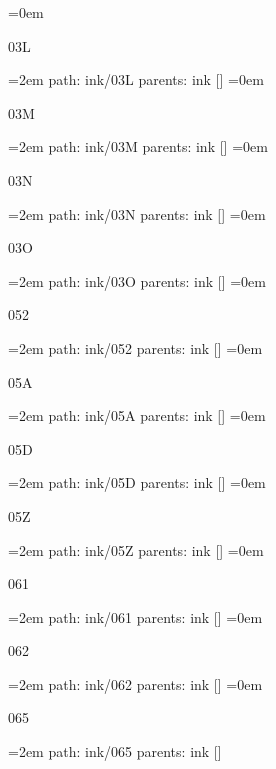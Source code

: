 \smallskip
\leftskip=0em
\par\endgroup
\bigskip
{}
03L
\smallskip
\par\begingroup
\leftskip=2em
path: ink/03L
\smallskip
parents:  ink []
\smallskip
\leftskip=0em
\par\endgroup
\bigskip
{}
03M
\smallskip
\par\begingroup
\leftskip=2em
path: ink/03M
\smallskip
parents:  ink []
\smallskip
\leftskip=0em
\par\endgroup
\bigskip
{}
03N
\smallskip
\par\begingroup
\leftskip=2em
path: ink/03N
\smallskip
parents:  ink []
\smallskip
\leftskip=0em
\par\endgroup
\bigskip
{}
03O
\smallskip
\par\begingroup
\leftskip=2em
path: ink/03O
\smallskip
parents:  ink []
\smallskip
\leftskip=0em
\par\endgroup
\bigskip
{}
052
\smallskip
\par\begingroup
\leftskip=2em
path: ink/052
\smallskip
parents:  ink []
\smallskip
\leftskip=0em
\par\endgroup
\bigskip
{}
05A
\smallskip
\par\begingroup
\leftskip=2em
path: ink/05A
\smallskip
parents:  ink []
\smallskip
\leftskip=0em
\par\endgroup
\bigskip
{}
05D
\smallskip
\par\begingroup
\leftskip=2em
path: ink/05D
\smallskip
parents:  ink []
\smallskip
\leftskip=0em
\par\endgroup
\bigskip
{}
05Z
\smallskip
\par\begingroup
\leftskip=2em
path: ink/05Z
\smallskip
parents:  ink []
\smallskip
\leftskip=0em
\par\endgroup
\bigskip
{}
061
\smallskip
\par\begingroup
\leftskip=2em
path: ink/061
\smallskip
parents:  ink []
\smallskip
\leftskip=0em
\par\endgroup
\bigskip
{}
062
\smallskip
\par\begingroup
\leftskip=2em
path: ink/062
\smallskip
parents:  ink []
\smallskip
\leftskip=0em
\par\endgroup
\bigskip
{}
065
\smallskip
\par\begingroup
\leftskip=2em
path: ink/065
\smallskip
parents:  ink []
